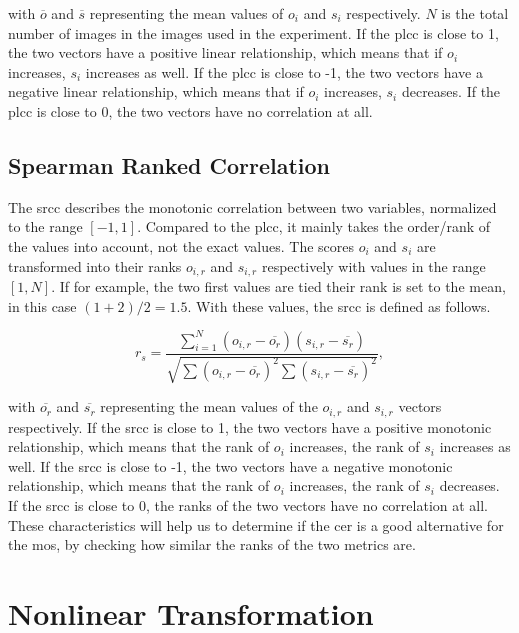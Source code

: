with $\overline{o}$ and $\overline{s}$ representing the mean values of $o_i$ and $s_i$ respectively.
$N$ is the total number of images in the images used in the experiment.
If the \gls{plcc} is close to 1, the two vectors have a positive linear relationship, which means that if $o_i$ increases, $s_i$ increases as well.
If the \gls{plcc} is close to -1, the two vectors have a negative linear relationship, which means that if $o_i$ increases, $s_i$ decreases.
If the \gls{plcc} is close to 0, the two vectors have no correlation at all.

\subsection{Spearman Ranked Correlation}
\label{subsec:spearman}

The \gls{srcc} \cite{pears_spear_2016} describes the monotonic correlation between two variables, normalized to the range $[-1, 1]$.
Compared to the \gls{plcc}, it mainly takes the order/rank of the values into account, not the exact values.
The scores $o_i$ and $s_i$ are transformed into their ranks $o_{i,r}$ and $s_{i,r}$ respectively with values in the range $[1, N]$.
If for example, the two first values are tied their rank is set to the mean, in this case $(1+2)/2 = 1.5$.
With these values, the \gls{srcc} is defined as follows.

\begin{equation}
    r_s = \frac{\sum_{i=1}^{N}{(o_{i,r}-\overline{o_r})(s_{i,r}-\overline{s_r})}}{\sqrt{\sum{(o_{i,r}-\overline{o_r})^2}\sum{(s_{i,r}-\overline{s_r})^2}}},
    \label{eq:spearman}
\end{equation}

with $\overline{o_r}$ and $\overline{s_r}$ representing the mean values of the $o_{i,r}$ and $s_{i,r}$ vectors respectively.
If the \gls{srcc} is close to 1, the two vectors have a positive monotonic relationship, which means that the rank of $o_i$ increases, the rank of $s_i$ increases as well.
If the \gls{srcc} is close to -1, the two vectors have a negative monotonic relationship, which means that the rank of $o_i$ increases, the rank of $s_i$ decreases.
If the \gls{srcc} is close to 0, the ranks of the two vectors have no correlation at all.
These characteristics will help us to determine if the \gls{cer} is a good alternative for the \gls{mos}, by checking how similar the ranks of the two metrics are.

\section{Nonlinear Transformation}
\label{sec:nonlinear}

